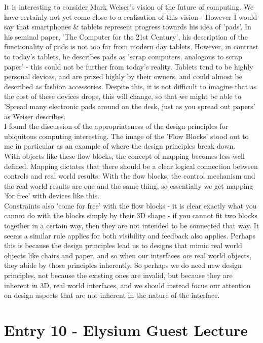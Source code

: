 \documentclass{article}
\begin{document}
\noindent It is interesting to consider Mark Weiser's vision of the future of computing. We have certainly not yet come close to a realisation of this vision - However I would say that smartphones \& tablets represent progress towards his idea of 'pads'. In his seminal paper, 'The Computer for the 21st Century', his description of the functionality of pads is not too far from modern day tablets. However, in contrast to today's tablets, he describes pads as 'scrap computers, analogous to scrap paper' - this could not be further from today's reality. Tablets tend to be highly personal devices, and are prized highly by their owners, and could almost be described as fashion accessories. Despite this, it is not difficult to imagine that as the cost of these devices drops, this will change, so that we might be able to 'Spread many electronic pads around on the desk, just as you spread out papers' as Weiser describes.
\\\indent I found the discussion of the appropriateness of the design principles for ubiquitous computing interesting. The image of the 'Flow Blocks' stood out to me in particular as an example of where the design principles break down.
\\\indent With objects like these flow blocks, the concept of mapping becomes less well defined. Mapping dictates that there should be a clear logical connection between controls and real world results. With the flow blocks, the control mechanism and the real world results are one and the same thing, so essentially we get mapping 'for free' with devices like this.
\\\indent Constraints also 'come for free' with the flow blocks - it is clear exactly what you cannot do with the blocks simply by their 3D shape - if you cannot fit two blocks together in a certain way, then they are not intended to be connected that way. It seems a similar rule applies for both visibility and feedback also applies. Perhaps this is because the design principles lead us to designs that mimic real world objects like chairs and paper, and so when our interfaces \emph{are} real world objects, they abide by those principles inherently. So perhaps we do need new design principles, not because the existing ones are invalid, but because they are inherent in 3D, real world interfaces, and we should instead focus our attention on design aspects that are not inherent in the nature of the interface.

\section*{Entry 10 - Elysium Guest Lecture}
\end{document}
